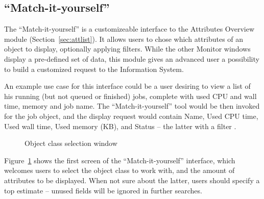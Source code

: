 \documentclass{article}
\begin{document}
\subsection{``Match-it-yourself''}
\label{sec:match}

The ``Match-it-yourself''  is a customizeable
interface to the Attributes Overview module
(Section~\ref{sec:attlist}). It allows users to chose which attributes
of an object to display, optionally applying filters. While the other
Monitor windows display a pre-defined set of data, this module gives
an advanced user a possibility to build a customized request to the
Information System.

An example use case for this interface could be a user desiring to
view a list of his running (but not queued or finished) jobs, complete
with used CPU and wall time, memory and job name. The
``Match-it-yourself'' tool would be then invoked for the \textsf{job}
object, and the display request would contain \textsf{Name},
\textsf{Used CPU time}, \textsf{Used wall time}, \textsf{Used memory
  (KB)}, and \textsf{Status} -- the latter with a filter
.

\begin{figure}[ht]
  \caption{\label{fig:match1}Object class selection window}
\end{figure}

Figure~\ref{fig:match1} shows the first screen of the
``Match-it-yourself'' interface, which welcomes users to select the
object class to work with, and the amount of attributes to be
displayed. When not sure about the latter, users should specify a top
estimate -- unused fields will be ignored in further searches.
\end{document}
